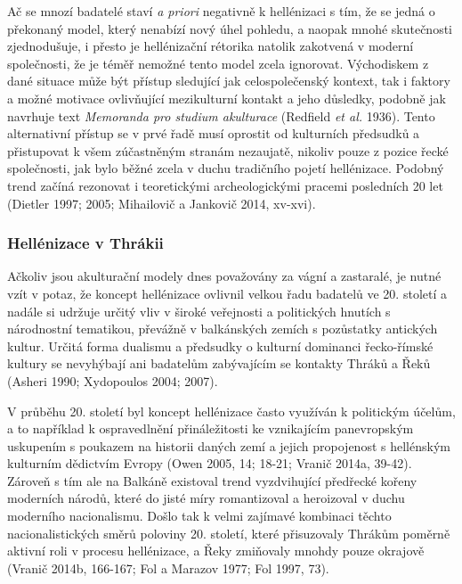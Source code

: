 Ač se mnozí badatelé staví {\em a priori} negativně k hellénizaci s tím, že se jedná o překonaný model, který nenabízí nový úhel pohledu, a naopak mnohé skutečnosti zjednodušuje, i přesto je hellénizační rétorika natolik zakotvená v moderní společnosti, že je téměř nemožné tento model zcela ignorovat. Východiskem z dané situace může být přístup sledující jak celospolečenský kontext, tak i faktory a možné motivace ovlivňující mezikulturní kontakt a jeho důsledky, podobně jak navrhuje text {\em Memoranda pro studium akulturace} (Redfield {\em et al.} 1936). Tento alternativní přístup se v prvé řadě musí oprostit od kulturních předsudků a přistupovat k všem zúčastněným stranám nezaujatě, nikoliv pouze z pozice řecké společnosti, jak bylo běžné zcela v duchu tradičního pojetí hellénizace. Podobný trend začíná rezonovat i teoretickými archeologickými pracemi posledních 20 let (Dietler 1997; 2005; Mihailovič a Jankovič 2014, xv-xvi).

\subsubsection[hellénizace-v-thrákii]{Hellénizace v Thrákii}

Ačkoliv jsou akulturační modely dnes považovány za vágní a zastaralé, je nutné vzít v potaz, že koncept hellénizace ovlivnil velkou řadu badatelů ve 20. století a nadále si udržuje určitý vliv v široké veřejnosti a politických hnutích s národnostní tematikou, převážně v balkánských zemích s pozůstatky antických kultur. Určitá forma dualismu a předsudky o kulturní dominanci řecko-římské kultury se nevyhýbají ani badatelům zabývajícím se kontakty Thráků a Řeků (Asheri 1990; Xydopoulos 2004; 2007).

V průběhu 20. století byl koncept hellénizace často využíván k politickým účelům, a to například k ospravedlnění přináležitosti ke vznikajícím panevropským uskupením s poukazem na historii daných zemí a jejich propojenost s hellénským kulturním dědictvím Evropy (Owen 2005, 14; 18-21; Vranič 2014a, 39-42). Zároveň s tím ale na Balkáně existoval trend vyzdvihující předřecké kořeny moderních národů, které do jisté míry romantizoval a heroizoval v duchu moderního nacionalismu. Došlo tak k velmi zajímavé kombinaci těchto nacionalistických směrů poloviny 20. století, které přisuzovaly Thrákům poměrně aktivní roli v procesu hellénizace, a Řeky zmiňovaly mnohdy pouze okrajově (Vranič 2014b, 166-167; Fol a Marazov 1977; Fol 1997, 73).


